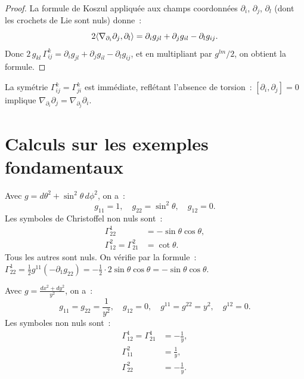 \begin{proof}
La formule de Koszul appliqu\'ee aux champs coordonn\'ees $\partial_i$, $\partial_j$,
$\partial_l$ (dont les crochets de Lie sont nuls) donne~:
\[
    2\langle \nabla_{\partial_i}\partial_j, \partial_l \rangle
    = \partial_i g_{jl} + \partial_j g_{il} - \partial_l g_{ij}.
\]
Donc $2\, g_{kl}\, \Gamma^k_{ij} = \partial_i g_{jl} + \partial_j g_{il} - \partial_l g_{ij}$,
et en multipliant par $g^{lm}/2$, on obtient la formule.
\end{proof}

\begin{remarque}
La sym\'etrie $\Gamma^k_{ij} = \Gamma^k_{ji}$ est imm\'ediate, refl\'etant l'absence
de torsion~: $[\partial_i, \partial_j] = 0$ implique
$\nabla_{\partial_i}\partial_j = \nabla_{\partial_j}\partial_i$.
\end{remarque}

\section{Calculs sur les exemples fondamentaux}

\begin{exemple}
Avec $g = d\theta^2 + \sin^2\!\theta\, d\phi^2$, on a~:
\[
    g_{11} = 1, \quad g_{22} = \sin^2\!\theta, \quad g_{12} = 0.
\]
Les symboles de Christoffel non nuls sont~:
\begin{align*}
    \Gamma^1_{22} &= -\sin\theta\cos\theta, \\
    \Gamma^2_{12} = \Gamma^2_{21} &= \cot\theta.
\end{align*}
Tous les autres sont nuls. On v\'erifie par la formule~:
$\Gamma^1_{22} = \frac{1}{2}g^{11}(-\partial_1 g_{22}) = -\frac{1}{2}\cdot 2\sin\theta\cos\theta
= -\sin\theta\cos\theta$.
\end{exemple}

\begin{exemple}
Avec $g = \frac{dx^2 + dy^2}{y^2}$, on a~:
\[
    g_{11} = g_{22} = \frac{1}{y^2}, \quad g_{12} = 0,
    \quad g^{11} = g^{22} = y^2, \quad g^{12} = 0.
\]
Les symboles non nuls sont~:
\begin{align*}
    \Gamma^1_{12} = \Gamma^1_{21} &= -\frac{1}{y}, \\
    \Gamma^2_{11} &= \frac{1}{y}, \\
    \Gamma^2_{22} &= -\frac{1}{y}.
\end{align*}
\end{exemple}


